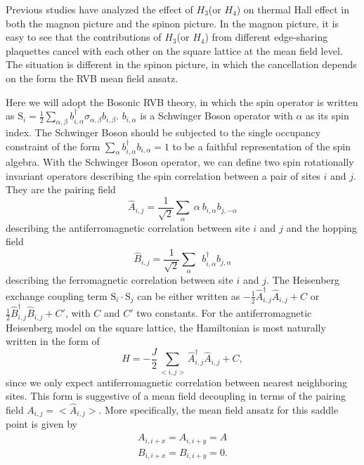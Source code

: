 \documentclass[prb,twocolumn,showpacs]{revtex4}
\begin{document}
Previous studies have analyzed the effect of $H_{3}$(or $H_{4}$) on thermal Hall effect in both the magnon picture and the spinon picture\cite{PALee2,Murakami,Hotta,PALee,Sachdev,Xu,ZXLi}. In the magnon picture, it is easy to see that the contributions of $H_{3}$(or $H_{4}$) from different edge-sharing plaquettes cancel with each other on the square lattice at the mean field level.  The situation is different in the spinon picture, in which the cancellation depends on the form the RVB mean field ansatz\cite{Sachdev}. 

Here we will adopt the Bosonic RVB theory\cite{Fermion}, in which the spin operator is written as $\mathrm{S}_{i}=\frac{1}{2}\sum_{\alpha,\beta}b^{\dagger}_{i,\alpha}\sigma_{\alpha,\beta}b_{i,\beta}$. $b_{i,\alpha}$ is a Schwinger Boson operator with $\alpha$ as its spin index. The Schwinger Boson should be subjected to the single occupancy constraint of the form  $\sum_{\alpha}b^{\dagger}_{i,\alpha}b_{i,\alpha}=1$ to be a faithful representation of the spin algebra. With the Schwinger Boson operator, we can define two spin rotationally invariant operators describing the spin correlation between a pair of sites $i$ and $j$. They are the pairing field
\begin{equation}
\hat{A}_{i,j}=\frac{1}{\sqrt{2}}\sum_{\alpha}\ \alpha \ b_{i,\alpha}b_{j,-\alpha}
\end{equation}
describing the antiferromagnetic correlation between site $i$ and $j$ and the hopping field
\begin{equation}
\hat{B}_{i,j}=\frac{1}{\sqrt{2}}\sum_{\alpha}\  \ b^{\dagger}_{i,\alpha}b_{j,\alpha}
\end{equation}
describing the ferromagnetic correlation between site $i$ and $j$. The Heisenberg exchange coupling term $\mathrm{S}_{i}\cdot\mathrm{S}_{j}$ can be either written as 
$-\frac{1}{2}\hat{A}^{\dagger}_{i,j}\hat{A}_{i,j}+C$ or $\frac{1}{2}\hat{B}^{\dagger}_{i,j}\hat{B}_{i,j}+C'$, with $C$ and $C'$ two constants.
For the antiferromagnetic Heisenberg model on the square lattice, the Hamiltonian is most naturally written in the form of
\begin{equation}
H=-\frac{J}{2}\sum_{<i,j>}\hat{A}^{\dagger}_{i,j}\hat{A}_{i,j}+C,
\end{equation}
since we only expect antiferromagnetic correlation between nearest neighboring sites. This form is suggestive of a mean field decoupling in terms of the pairing field $A_{i,j}=<\hat{A}_{i,j}>$. More specifically, the mean field ansatz for this saddle point is given by
\begin{eqnarray}
A_{i,i+x}=A_{i,i+y}=A\nonumber\\
B_{i,i+x}=B_{i,i+y}=0.
\end{eqnarray}
\end{document}
